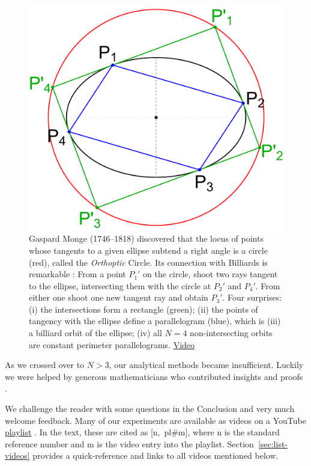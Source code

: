 %
\begin{figure}[ht]
    \centering
    \includegraphics[width=.5\textwidth]{pics/u0200_monge_orthoptic.pdf}
    \caption{Gaspard Monge (1746--1818) discovered that the locus of points whose tangents to a given ellipse subtend a right angle is a circle (red), called the {\em Orthoptic} Circle. Its connection with Billiards is remarkable \cite{connes07}: From a point $P_1'$ on the circle, shoot two rays tangent to the ellipse, intersecting them with the circle at $P_2'$ and $P_4'$. From either one shoot one new tangent ray and obtain $P_3'$. Four surprises: (i) the intersections form a rectangle (green); (ii) the points of tangency with the ellipse define a parallelogram (blue), which is (iii) a billiard orbit of the ellipse; (iv) all $N=4$ non-intersecting orbits are constant perimeter parallelograms. 
    \href{https://youtu.be/9fI3iM2jrmI}{Video} \cite[pl\#5]{dsr_math_intell_playlist}}    \label{fig:monge-orthoptic}
\end{figure}

As we crossed over to $N>3$, our analytical methods became insufficient. Luckily we were helped by generous mathematicians who contributed insights and proofs \cite{akopyan19_private_meromorphic,helman19,dominique19,olga19_mitten,sergei19_private_circles,sergei19_private_meromorphic}. 

We challenge the reader with some questions in the Conclusion and very much welcome feedback. Many of our experiments are available as videos on a YouTube \href{https://bit.ly/2kTvPPr}{playlist} \cite{dsr_math_intell_playlist}. In the text, these are cited as {[n,~pl\#m]}, where n is the standard reference number and m is the video entry into the playlist. Section~\ref{sec:list-videos} provides a quick-reference and links to all videos mentioned below.